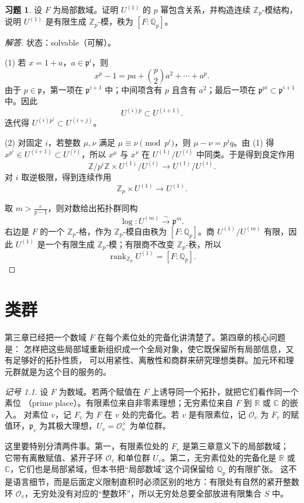 \documentclass[11pt,a4paper,openany]{ctexbook}
\numberwithin{equation}{chapter}
\newcommand{\Q}{\mathbb{Q}}
\newcommand{\R}{\mathbb{R}}
\newcommand{\C}{\mathbb{C}}
\newcommand{\Z}{\mathbb{Z}}
\theoremstyle{plain}
\theoremstyle{definition}
\newtheorem{exercise}[theorem]{习题}
\theoremstyle{remark}
\newtheorem{notation}[theorem]{记号}
\begin{document}
\begin{exercise}
设 $F$ 为局部数域。证明 $U^{(1)}$ 的 $p$ 幂包含关系，并构造连续 $\Z_p$-模结构，说明 $U^{(1)}$ 是有限生成 $\Z_p$-模，秩为 $[F:\Q_p]$。
\end{exercise}

\begin{proof}[解答]
状态：solvable（可解）。

(1) 若 $x=1+a$，$a\in\mathfrak p^i$，则
\[
x^p-1=pa+\binom p2a^2+\cdots+a^p.
\]
由于 $p\in\mathfrak p$，第一项在 $\mathfrak p^{i+1}$ 中；中间项含有 $p$ 且含有
$a^2$；最后一项在 $\mathfrak p^{pi}\subset\mathfrak p^{i+1}$ 中。因此
\[
U^{(i)p}\subset U^{(i+1)}.
\]
迭代得 $U^{(i)p^j}\subset U^{(i+j)}$。

(2) 对固定 $i$，若整数 $\mu,\nu$ 满足 $\mu\equiv\nu\pmod{p^i}$，则
$\mu-\nu=p^iq$。由 (1) 得 $x^{p^i}\in U^{(i+1)}\subset U^{(i)}$，所以
$x^\mu$ 与 $x^\nu$ 在 $U^{(1)}/U^{(i)}$ 中同类。于是得到良定作用
\[
\Z/p^i\Z\times U^{(1)}/U^{(i)}\to U^{(1)}/U^{(i)}.
\]
对 $i$ 取逆极限，得到连续作用
\[
\Z_p\times U^{(1)}\to U^{(1)}.
\]

取 $m>\frac e{p-1}$，则对数给出拓扑群同构
\[
\log:U^{(m)}\xrightarrow{\sim}\mathfrak p^m.
\]
右边是 $F$ 的一个 $\Z_p$-格，作为 $\Z_p$-模自由秩为 $[F:\Q_p]$。商
$U^{(1)}/U^{(m)}$ 有限，因此 $U^{(1)}$ 是一个有限生成 $\Z_p$-模；有限商不改变
$\Z_p$-秩，所以
\[
\operatorname{rank}_{\Z_p}U^{(1)}=[F:\Q_p].
\]
\end{proof}
 \chapter{类群}

第三章已经把一个数域 $F$ 在每个素位处的完备化讲清楚了。第四章的核心问题是：
怎样把这些局部域重新组织成一个全局对象，使它既保留所有局部信息，又有足够好的拓扑性质，
可以用紧性、离散性和商群来研究理想类群。加元环和理元群就是为这个目的服务的。

\begin{notation}
设 $F$ 为数域。若两个赋值在 $F$ 上诱导同一个拓扑，就把它们看作同一个素位
（prime place）。有限素位来自非零素理想；无穷素位来自 $F$ 到 $\R$ 或 $\C$ 的嵌入。
对素位 $v$，记 $F_v$ 为 $F$ 在 $v$ 处的完备化。若 $v$ 是有限素位，记
$\mathcal O_v$ 为 $F_v$ 的赋值环，$\mathfrak p_v$ 为其极大理想，$U_v=\mathcal O_v^\times$
为单位群。
\end{notation}

这里要特别分清两件事。第一，有限素位处的 $F_v$ 是第三章意义下的局部数域；
它带有离散赋值、紧开子环 $\mathcal O_v$ 和单位群 $U_v$。第二，无穷素位处的完备化是
$\R$ 或 $\C$，它们也是局部紧域，但本书把“局部数域”这个词保留给 $\Q_p$ 的有限扩张。
这不是语言细节，而是后面定义限制直积时必须区别的地方：有限处有自然的紧开整数环
$\mathcal O_v$，无穷处没有对应的“整数环”，所以无穷处总要全部放进有限集合 $S$ 中。
\end{document}
